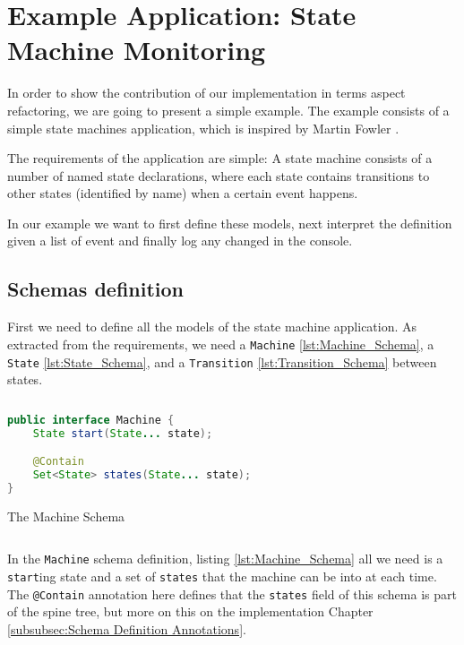 
\chapter{Example Application: State Machine Monitoring}\label{Example Application}
In order to show the contribution of our implementation in terms aspect refactoring, we are going to present a simple example.
The example consists of a simple state machines application, which is inspired by Martin Fowler \cite{fowler2010domain}.

The requirements of the application are simple: A state machine consists of a number of named state declarations, where each state contains transitions to other states (identified by name) when a certain event happens.

In our example we want to first define these models, next interpret the definition given a list of event and finally log any changed in the console.

\section{Schemas definition}
First we need to define all the models of the state machine application. 
As extracted from the requirements, we need a \texttt{Machine} \ref{lst:Machine_Schema}, a \texttt{State} \ref{lst:State_Schema}, and a \texttt{Transition} \ref{lst:Transition_Schema} between states.

\begin{sourcecode}
	\begin{lstlisting}[language=Java,escapechar=|]
public interface Machine {
    State start(State... state);

    @Contain
    Set<State> states(State... state);
}
	\end{lstlisting}
	\caption{The Machine Schema}
	\label{lst:Machine_Schema}
\end{sourcecode}

In the \texttt{Machine} schema definition, listing \ref{lst:Machine_Schema} all we need is a \texttt{start}ing state and a set of \texttt{states} that the machine can be into at each time.
The \texttt{@Contain} annotation here defines that the \texttt{states} field of this schema is part of the spine tree, but more on this on the implementation Chapter \ref{subsubsec:Schema Definition Annotations}.

